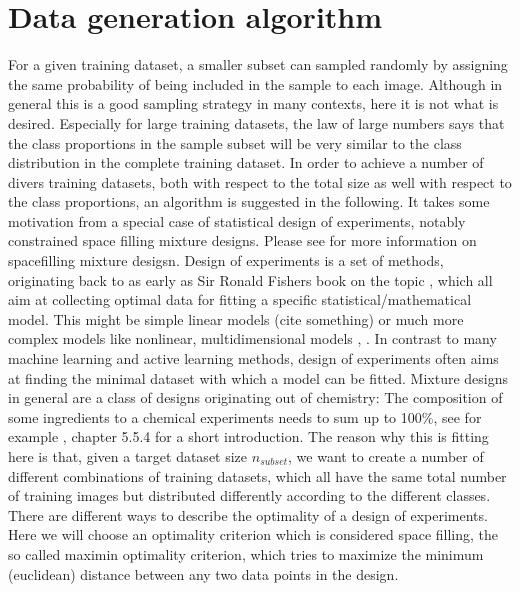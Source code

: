 \documentclass{article} %
\begin{document}
\section{Data generation algorithm}




For a given training dataset, a smaller subset can sampled randomly by assigning the same probability of being included in the sample to each image.
Although in general this is a good sampling strategy in many contexts, here it is not what is desired.
Especially for large training datasets, the law of large numbers says that the class proportions in the sample subset will be very similar to the class distribution in the complete training dataset.
In order to achieve a number of divers training datasets, both with respect to the total size as well with respect to the class proportions, an algorithm is suggested in the following.
It takes some motivation from a special case of statistical design of experiments, notably constrained space filling mixture designs. Please see \cite{gomes_hal_spacefilling_mixtures} for more information on spacefilling mixture desigsn.
Design of experiments is a set of methods, originating back to as early as Sir Ronald Fishers book on the topic \cite{fisher_1935}, which all aim at collecting optimal data for fitting a specific statistical/mathematical model. This might be simple linear models (cite something) or much more complex
models like nonlinear, multidimensional models \cite{myers2009response}, \cite{Goos_Jones_optDoE_2011}. In contrast to many machine learning and active learning methods, design of experiments
often aims at finding the minimal dataset with which a model can be fitted.
Mixture designs in general are a class of designs originating out of chemistry: The composition of some ingredients to a chemical experiments needs to sum up to 100\%, see for example \cite{Nist_2012_eng_stats}, chapter 5.5.4 for a short introduction.
The reason why this is fitting here is that, given a target dataset size $n_{subset}$, we want to create a number of different combinations of training datasets, which all have the same total number of training images but distributed differently according to the different classes.
There are different ways to describe the optimality of a design of experiments. Here we will choose an optimality criterion which is considered space filling, the so called maximin optimality criterion, which tries to maximize the minimum (euclidean) distance between any two data points in the design.
\end{document}
